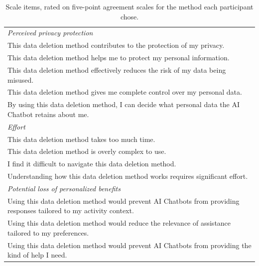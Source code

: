 \begin{table}[H]
\centering
\caption{Scale items, rated on five-point agreement scales for the method each participant chose.}
\label{tab:scale-items}
\footnotesize
\begin{tabular}{@{}p{}@{}}
\toprule
\textit{Perceived privacy protection}~\cite{xu2011information} \\
This data deletion method contributes to the protection of my privacy. \\
This data deletion method helps me to protect my personal information. \\
This data deletion method effectively reduces the risk of my data being misused. \\
This data deletion method gives me complete control over my personal data. \\
By using this data deletion method, I can decide what personal data the AI Chatbot retains about me. \\
\midrule
\textit{Effort}~\cite{habib2022evaluating} \\
This data deletion method takes too much time. \\
This data deletion method is overly complex to use. \\
I find it difficult to navigate this data deletion method. \\
Understanding how this data deletion method works requires significant effort. \\
\midrule
\textit{Potential loss of personalized benefits}~\cite{xu2011personalization} \\
Using this data deletion method would prevent AI Chatbots from providing responses tailored to my activity context. \\
Using this data deletion method would reduce the relevance of assistance tailored to my preferences. \\
Using this data deletion method would prevent AI Chatbots from providing the kind of help I need. \\
\bottomrule
\end{tabular}
\end{table}

